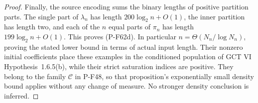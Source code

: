 \begin{proof}
Finally, the source encoding sums the binary lengths
of positive partition parts. The single part of
$\lambda_n$ has length $200\log_2n+O(1)$, the inner
partition has length two, and each of the $n$ equal
parts of $\pi_n$ has length $199\log_2n+O(1)$.
This proves (P-F62d). In particular
$n=\Theta(N_n/\log N_n)$, proving the stated lower
bound in terms of actual input length. Their nonzero
initial coefficients place these examples in the
conditioned population of GCT VI Hypothesis~1.6.5(b),
while their strict saturation indices are positive.
They belong to the family $\mathcal C$ in P-F48, so
that proposition's exponentially small density bound
applies without any change of measure. No stronger
density conclusion is inferred.
\end{proof}
